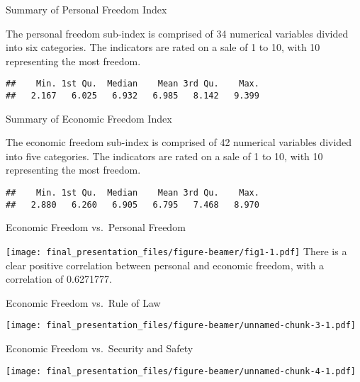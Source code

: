 \documentclass[ignorenonframetext,]{beamer}
\begin{document}
\begin{frame}[fragile]{Summary of Personal Freedom Index}
\protect\hypertarget{summary-of-personal-freedom-index}{}

The personal freedom sub-index is comprised of 34 numerical variables
divided into six categories. The indicators are rated on a sale of 1 to
10, with 10 representing the most freedom.

\begin{verbatim}
##    Min. 1st Qu.  Median    Mean 3rd Qu.    Max. 
##   2.167   6.025   6.932   6.985   8.142   9.399
\end{verbatim}

\end{frame}

\begin{frame}[fragile]{Summary of Economic Freedom Index}
\protect\hypertarget{summary-of-economic-freedom-index}{}

The economic freedom sub-index is comprised of 42 numerical variables
divided into five categories. The indicators are rated on a sale of 1 to
10, with 10 representing the most freedom.

\begin{verbatim}
##    Min. 1st Qu.  Median    Mean 3rd Qu.    Max. 
##   2.880   6.260   6.905   6.795   7.468   8.970
\end{verbatim}

\end{frame}

\begin{frame}{Economic Freedom vs.~Personal Freedom}
\protect\hypertarget{economic-freedom-vs.personal-freedom}{}

\texttt{[image: final\_presentation\_files/figure-beamer/fig1-1.pdf]}
There is a clear positive correlation between personal and economic
freedom, with a correlation of 0.6271777.

\end{frame}

\begin{frame}{Economic Freedom vs.~Rule of Law}
\protect\hypertarget{economic-freedom-vs.rule-of-law}{}

\texttt{[image: final\_presentation\_files/figure-beamer/unnamed-chunk-3-1.pdf]}

\end{frame}

\begin{frame}{Economic Freedom vs.~Security and Safety}
\protect\hypertarget{economic-freedom-vs.security-and-safety}{}

\texttt{[image: final\_presentation\_files/figure-beamer/unnamed-chunk-4-1.pdf]}

\end{frame}
\end{document}
